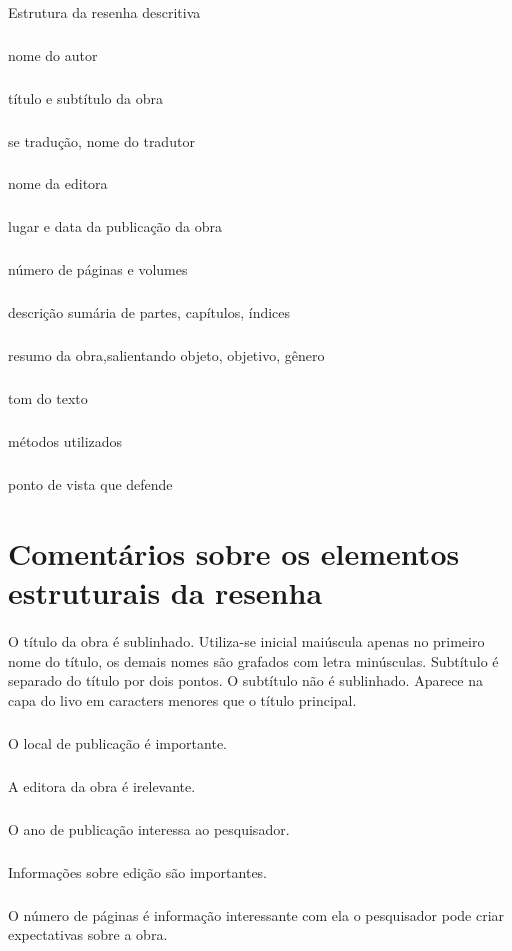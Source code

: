 \paragraph{}
Estrutura da resenha descritiva

\subparagraph{}
nome do autor
\subparagraph{}
título e subtítulo da obra
\subparagraph{}
se tradução, nome do tradutor
\subparagraph{}
nome da editora
\subparagraph{}
lugar e data da publicação da obra
\subparagraph{}
número de páginas e volumes
\subparagraph{}
descrição sumária de partes, capítulos, índices
\subparagraph{}
resumo da obra,salientando objeto, objetivo, gênero
\subparagraph{}
tom do texto
\subparagraph{}
métodos utilizados
\subparagraph{}
ponto de vista que defende

\section{Comentários sobre os elementos estruturais da resenha}

\paragraph{}
O título da obra é sublinhado. Utiliza-se inicial maiúscula apenas no primeiro nome do título, os demais nomes são grafados com letra minúsculas. Subtítulo é separado do título por dois pontos. O subtítulo não é sublinhado. Aparece na capa do livo em caracters menores que o título principal.

\subparagraph{}
O local de publicação é importante.

\subparagraph{}
A editora da obra é irelevante. 

\subparagraph{}
O ano de publicação interessa ao pesquisador.

\subparagraph{}
Informações sobre edição são importantes.

\subparagraph{}
O número de páginas é informação interessante com ela o pesquisador pode criar expectativas sobre a obra.